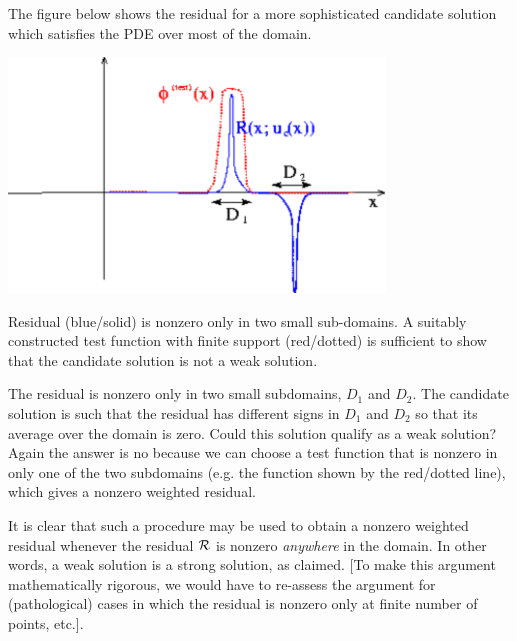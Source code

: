 The figure below shows the residual for a more sophisticated candidate solution which satisfies the P\-D\-E over most of the domain.  
\begin{DoxyImage}
\includegraphics[width=0.75\textwidth]{weaksoln2}
\caption{Residual (blue/solid) is nonzero only in two small sub-\/domains. A suitably constructed test function with finite support (red/dotted) is sufficient to show that the candidate solution is not a weak solution. }
\end{DoxyImage}
 The residual is nonzero only in two small subdomains, $ D_1$ and $ D_2 $. The candidate solution is such that the residual has different signs in $ D_1$ and $ D_2 $ so that its average over the domain is zero. Could this solution qualify as a weak solution? Again the answer is no because we can choose a test function that is nonzero in only one of the two subdomains (e.\-g. the function shown by the red/dotted line), which gives a nonzero weighted residual.

It is clear that such a procedure may be used to obtain a nonzero weighted residual whenever the residual $ {\cal R} $ is nonzero {\itshape anywhere} in the domain. In other words, a weak solution is a strong solution, as claimed. \mbox{[}To make this argument mathematically rigorous, we would have to re-\/assess the argument for (pathological) cases in which the residual is nonzero only at finite number of points, etc.\mbox{]}.




